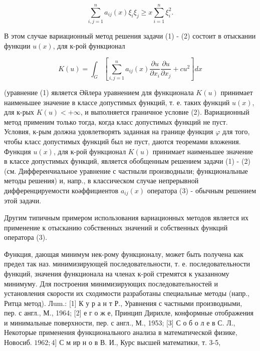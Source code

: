 \documentclass[10pt]{article}
\begin{document}
\[

\sum_{i, j=1}^{n} a_{i j}(x) \xi_{i} \xi_{j} \geqslant x \sum_{i=1}^{n} \xi_{i}^{2} .

\]



В этом случае вариационный метод решения задачи (1) - (2) состоит в отыскании функции $u(x)$, для к-рой функционал



\[

K(u)=\int_{G}\left[\sum_{i, j=1}^{n} a_{i j}(x) \frac{\partial u}{\partial x_{i}} \frac{\partial u}{\partial x_{j}}+c u^{2}\right] d x

\]



(уравнение (1) является Әйлера уравнением для функционала $K(u)$ принимает наименьшее значение в классе допустимых функций, т. е. таких функций $u(x)$, для к-рых $K(u)<+\infty$, и выполняется граничное условие (2). Вариационный метод применим только тогда, когда класс допустимых функций не пуст. Условия, к-рым должна удовлетворять заданная на границе функция $\varphi$ для того, чтобы класс допустимых функций был не пуст, даются теоремами вложения. Функция $u(x)$, для к-рой функционал $K(u)$ принимает наименьшее значение в классе допустимых функций, является обобщенным решением задачи (1) - (2) (см. Дифференчиальное уравнение с частныли производныли; функциональные методы решения) и, напр., в классическом случае непрерывной дифференцируемости коәффициентов $a_{i j}(x)$ оператора (3) - обычным решением этой задачи.



Другим типичным примером использования вариационных методов является их применение к отысканию собственных значений и собственных функций оператора (3).



Функция, дающая минимум нек-рому функционалу, может быть получена как предел так наз. минимизирующей последовательности, т. е. последовательности функций, значения функционала на членах к-рой стремятся к указанному минимуму. Для построения минимизирующих последовательностей и установления скорости их сходимости разработаны специальные методы (напр., Ритца метод). Лum.: [1] К у р а н т Р., Уравнения с частными производными, пер. с англ., М., 1964; [2] е г о ж е, Принцип Дирихле, конформные отображения и минимальные поверхности, пер. с англ., М., 1953; [3] С о б о л е в С. Л., Некоторые применения функционального анализа в математической физике, Новосиб. $1962 ; 4]$ С м ир н о в В. И., Курс высшей математики, т. 3-5,
\end{document}
